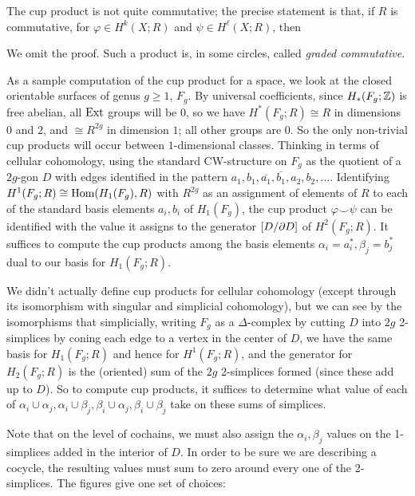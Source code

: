 \msk

The cup product is not quite commutative; the precise statement is that, if $R$ is commutative, for $\varphi\in H^k(X;R)$
and $\psi\in H^{\ell}(X;R)$, then 


 We omit the proof.
Such a product is, in some circles, called {\it graded commutative}.

\ssk

As a sample computation of the cup product for a space, we look at the closed orientable surfaces of genus $g\geq 1$, $F_g$.
By universal coefficients, since $H_*(F_g;{\Bbb Z})$ is free abelian, all $\text{Ext}$ groups will be $0$, so we have 
$H^*(F_g;R)\cong R$ in dimensions $0$ and $2$, and $\cong R^{2g}$ in dimension $1$; all other groups are $0$. 
So the only non-trivial
cup products will occur between $1$-dimensional classes. Thinking in terms of cellular cohomology, using the standard 
CW-structure on $F_g$ as the quotient of a $2g$-gon $D$ with edges identified in the pattern 
$a_1,b_1,\overline{a_1},\overline{b_1},a_2,b_2,\ldots$. Identifying $H^1(F_g;R)\cong \text{Hom}(H_1(F_g),R)$ 
with $R^{2g}$ as an assignment of elements of $R$ to each of the standard basis elements $a_i,b_i$ of $H_1(F_g)$,
the cup product $\varphi\smile\psi$ can be identified with the value it assigns to the generator $[D/\partial D]$ of $H^2(F_g;R)$.
It suffices to compute the cup products among the basis elements $\alpha_i=a_i^*,\beta_j=b_j^*$ dual to our basis for $H_1(F_g;R)$.

\ssk

We didn't actually \u{define} cup products for cellular cohomology (except through its isomorphism with singular 
and simplicial cohomology), but we can see by the isomorphisms that simplicially, writing $F_g$ as
a $\Delta$-complex by cutting $D$ into $2g$ 2-simplices by coning each edge to a vertex in the center of $D$, we have the same
basis for $H_1(F_g;R)$ and hence for $H^1(F_g;R)$, and the generator for $H_2(F_g;R)$ is the (oriented) sum of the
$2g$ 2-simplices formed (since these add up to $D$). So to compute cup products, it suffices to determine what value
of each of $\alpha_i\cup\alpha_j,\alpha_i\cup\beta_j,\beta_i\cup\alpha_j,\beta_i\cup\beta_j$ take on these sums of
simplices. 

\ssk

Note that on the level of cochains, we must also assign the $\alpha_i,\beta_j$ values
on the 1-simplices added in the interior of $D$. In order to be sure we are describing a cocycle, the resulting values must 
sum to zero around every one of the 2-simplices. The figures give one set of choices:

